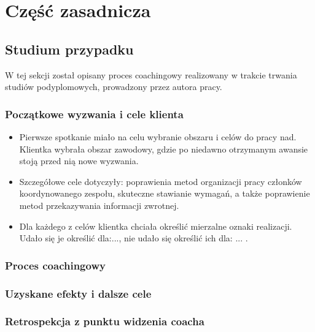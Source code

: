 
\chapter{Część zasadnicza}

\section{Studium przypadku}

W tej sekcji został opisany proces coachingowy realizowany w trakcie trwania studiów podyplomowych, prowadzony przez autora pracy.

\subsection{Początkowe wyzwania i cele klienta}

\begin{itemize}
  \item Pierwsze spotkanie miało na celu wybranie obszaru i celów do pracy nad. Klientka wybrała obszar zawodowy, gdzie po niedawno otrzymanym awansie stoją przed nią nowe wyzwania.
  \item Szczegółowe cele dotyczyły: poprawienia metod organizacji pracy członków koordynowanego zespołu, skuteczne stawianie wymagań, a także poprawienie metod przekazywania informacji zwrotnej.
  \item Dla każdego z celów klientka chciała określić mierzalne oznaki realizacji. Udało się je określić dla:..., nie udało się określić ich dla: ... .
\end{itemize}

\subsection{Proces coachingowy}

\subsection{Uzyskane efekty i dalsze cele}

\subsection{Retrospekcja z punktu widzenia coacha}

